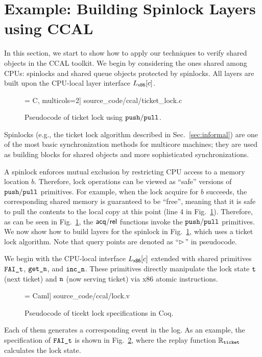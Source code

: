 \section{Example: Building Spinlock Layers using CCAL}
\label{chapter:ccal:sec:example}


In this section, we start to show how to apply our techniques to verify shared objects in the CCAL toolkit.
We begin by considering the ones
shared among CPUs: spinlocks and shared queue objects protected by spinlocks.
All layers are built upon the CPU-local layer interface
$L_\mathsf{x86}[c]$.


\begin{figure}[t]
 = C, multicols=2] {source_code/ccal/ticket_lock.c}
\caption{Pseudocode of ticket lock using ${\mathrm{\texttt{push}}}/{\mathrm{\texttt{pull}}}$.}
\label{fig:exp:real_ticket_lock}
\end{figure}

Spinlocks (e.g., the ticket lock algorithm described in Sec.~\ref{sec:informal}) 
are one of the most basic synchronization
methods for multicore machines; they are used as building
blocks for shared objects and more sophisticated synchronizations.

A spinlock enforces mutual exclusion by restricting CPU access to
a memory location $b$. Therefore, lock operations can be viewed
as ``safe'' versions of ${\mathrm{\texttt{push}}}/{\mathrm{\texttt{pull}}}$ primitives.
For example, when the lock acquire  for $b$ succeeds,
the corresponding shared memory is guaranteed
to be ``free'', meaning that it is safe to 
pull the contents to the local copy at this point (line 4 in Fig.~\ref{fig:exp:real_ticket_lock}).
Therefore, as can be seen in Fig.~\ref{fig:exp:real_ticket_lock},
the $\mathsf{acq}/\mathsf{rel}$ functions invoke the ${\mathrm{\texttt{push}}}/{\mathrm{\texttt{pull}}}$ primitives.
We now show how to build layers for the spinlock
in Fig.~\ref{fig:exp:real_ticket_lock}, which uses a ticket lock algorithm. Note that query points are denoted as ``$\rhd$'' in pseudocode.

We begin with the CPU-local interface $L_\mathsf{x86}[c]$ extended with shared primitives
${\mathrm{\texttt{FAI\_t}}}$, ${\mathrm{\texttt{get\_n}}}$, and ${\mathrm{\texttt{inc\_n}}}$.
These primitives directly manipulate the lock state ${\mathrm{\texttt{t}}}$
(next ticket) and ${\mathrm{\texttt{n}}}$ (now serving ticket)
via x86 atomic instructions. 

\begin{figure}[t]
 = Caml] {source_code/ccal/lock.v}
\caption{Pseudocode of ticekt lock specifications in Coq.}
\label{fig:exp:tlock}
\end{figure}
Each of them generates a corresponding event in the 
log. As an example, the specification of ${\mathrm{\texttt{FAI\_t}}}$ is shown in Fig.~\ref{fig:exp:tlock},
where the replay function $\mathbb{R}_{{\mathrm{\texttt{ticket}}}}$ calculates  the lock state.
 
